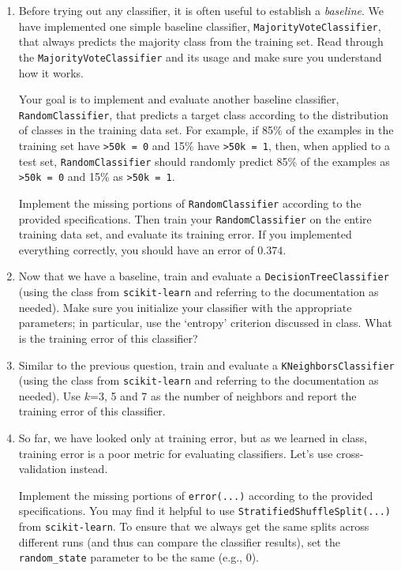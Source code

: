 \begin{enumerate}[resume]

\item {} Before trying out any classifier, it is often useful to establish a \emph{baseline}. We have implemented one simple baseline classifier, \verb|MajorityVoteClassifier|, that always predicts the majority class from the training set. Read through the \verb|MajorityVoteClassifier| and its usage and make sure you understand how it works.

Your goal is to implement and evaluate another baseline classifier, \verb|RandomClassifier|, that predicts a target class according to the distribution of classes in the training data set. For example, if 85\% of the examples in the training set have \verb|>50k = 0| and 15\% have \verb|>50k = 1|, then, when applied to a test set, \verb|RandomClassifier| should randomly predict 85\% of the examples as \verb|>50k = 0| and 15\% as \verb|>50k = 1|.

Implement the missing portions of \verb|RandomClassifier| according to the provided specifications. Then train your \verb|RandomClassifier| on the entire training data set, and evaluate its training error. If you implemented everything correctly, you should have an error of {\color {red} {$0.374$.} }

\item {} Now that we have a baseline, train and evaluate a \verb|DecisionTreeClassifier| (using the class from \verb|scikit-learn| and referring to the documentation as needed). Make sure you initialize your classifier with the appropriate parameters; in particular, use the `entropy' criterion discussed in class. What is the training error of this classifier?
\solution{}

\item {} Similar to the previous question, train and evaluate a \verb|KNeighborsClassifier| (using the class from \verb|scikit-learn| and referring to the documentation as needed). Use $k$=3, 5 and 7 as the number of neighbors and report the training error of this classifier.
\solution{}

\item {} So far, we have looked only at training error, but as we learned in class, training error is a poor metric for evaluating classifiers. Let's use cross-validation instead.

Implement the missing portions of \verb|error(...)| according to the provided specifications. You may find it helpful to use \verb|StratifiedShuffleSplit(...)| from \verb|scikit-learn|. To ensure that we always get the same splits across different runs (and thus can compare the classifier results), set the \verb|random_state| parameter to be the same (e.g., 0).



\end{enumerate}

